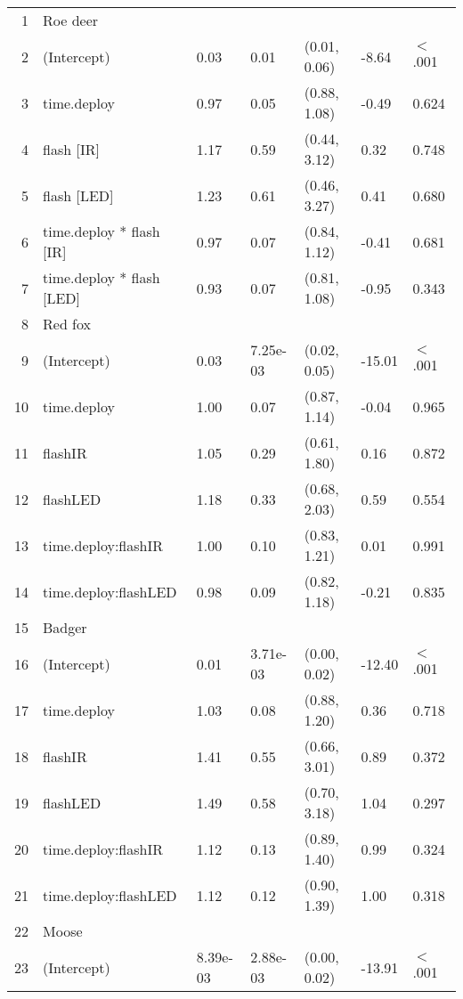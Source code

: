 \begin{table}[ht]
\centering
\begin{tabular}{rllllll}
  \hline
  \hline
1 & Roe deer &  &  &  &  &        \\ 
  2 & (Intercept) & 0.03 & 0.01 & (0.01, 0.06) & -8.64 & $<$ .001 \\ 
  3 & time.deploy & 0.97 & 0.05 & (0.88, 1.08) & -0.49 & 0.624  \\ 
  4 & flash [IR] & 1.17 & 0.59 & (0.44, 3.12) & 0.32 & 0.748  \\ 
  5 & flash [LED] & 1.23 & 0.61 & (0.46, 3.27) & 0.41 & 0.680  \\ 
  6 & time.deploy * flash [IR] & 0.97 & 0.07 & (0.84, 1.12) & -0.41 & 0.681  \\ 
  7 & time.deploy * flash [LED] & 0.93 & 0.07 & (0.81, 1.08) & -0.95 & 0.343  \\ 
  8 & Red fox &  &  &  &  &        \\ 
  9 & (Intercept) & 0.03 & 7.25e-03 & (0.02, 0.05) & -15.01 & $<$ .001 \\ 
  10 & time.deploy & 1.00 & 0.07 & (0.87, 1.14) & -0.04 & 0.965  \\ 
  11 & flashIR & 1.05 & 0.29 & (0.61, 1.80) & 0.16 & 0.872  \\ 
  12 & flashLED & 1.18 & 0.33 & (0.68, 2.03) & 0.59 & 0.554  \\ 
  13 & time.deploy:flashIR & 1.00 & 0.10 & (0.83, 1.21) & 0.01 & 0.991  \\ 
  14 & time.deploy:flashLED & 0.98 & 0.09 & (0.82, 1.18) & -0.21 & 0.835  \\ 
  15 & Badger &  &  &  &  &        \\ 
  16 & (Intercept) & 0.01 & 3.71e-03 & (0.00, 0.02) & -12.40 & $<$ .001 \\ 
  17 & time.deploy & 1.03 & 0.08 & (0.88, 1.20) & 0.36 & 0.718  \\ 
  18 & flashIR & 1.41 & 0.55 & (0.66, 3.01) & 0.89 & 0.372  \\ 
  19 & flashLED & 1.49 & 0.58 & (0.70, 3.18) & 1.04 & 0.297  \\ 
  20 & time.deploy:flashIR & 1.12 & 0.13 & (0.89, 1.40) & 0.99 & 0.324  \\ 
  21 & time.deploy:flashLED & 1.12 & 0.12 & (0.90, 1.39) & 1.00 & 0.318  \\ 
  22 & Moose &  &  &  &  &        \\ 
  23 & (Intercept) & 8.39e-03 & 2.88e-03 & (0.00, 0.02) & -13.91 & $<$ .001 \\ 

\end{tabular}
\end{table}
